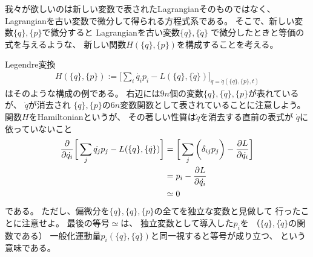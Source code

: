 我々が欲しいのは新しい変数で表されたLagrangianそのものではなく、
Lagrangianを古い変数で微分して得られる方程式系である。
そこで、新しい変数$\{q\},\{p\}$で微分すると
Lagrangianを古い変数$\{q\}, \{\dot{q}\}$
で微分したときと等価の式を与えるような、
新しい関数$H(\{q\},\{p\})$を構成することを考える。

Legendre変換
\begin{align}
  H(\{q\},\{p\})
  :=
  \bigg[
    \sum_i 
      \dot{q_i} p_i
  - L(\{q\}, \{\dot{q}\})
  \bigg]_{\dot{q} = \dot{q}(\{q\},\{p\},t)}
\end{align}
はそのような構成の例である。
右辺には$9n$個の変数$\{q\},\{\dot{q}\},\{p\}$が表れているが、
$\dot{q}$が消去され
$\{q\},\{p\}$の$6n$変数関数として表されていることに注意しよう。
関数$H$をHamiltonianというが、
その著しい性質は$\dot{q}$を消去する直前の表式が
$\dot{q}$に依っていないこと
\begin{align}
  \dfrac{\partial}{\partial \dot{q_i}}
  \bigg[
    \sum_j
      \dot{q_j} p_j
  - L(\{q\}, \{\dot{q}\})
  \bigg]
  &=
  \bigg[
    \sum_j\bigg(
      \delta_{ij} p_j
    \bigg)
  - \dfrac{\partial L}{\partial \dot{q_i}}
  \bigg]
\notag\\&=
    p_i
    - \dfrac{\partial L}{\partial \dot{q_i}}
\notag\\
  &\simeq 0
\end{align}
である。
ただし、偏微分を$\{q\},\{\dot{q}\},\{p\}$の全てを独立な変数と見做して
行ったことに注意せよ。
最後の等号$\simeq$は、
独立変数として導入した$p_i$を
（$\{q\},\{\dot{q}\}$の関数である）
一般化運動量$p_i(\{q\},\{\dot{q}\})$と同一視すると等号が成り立つ、
という意味である。

